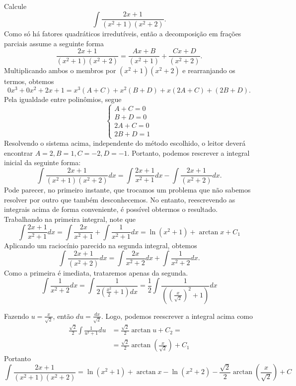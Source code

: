 	\begin{ex}
		Calcule $$\int \frac{2x + 1}{(x^2 + 1)(x^2 + 2)}.$$ Como só há fatores quadráticos irredutíveis, então a decomposição em frações parciais assume a seguinte forma $$\frac{2x + 1}{(x^2 + 1)(x^2+2)} = \frac{Ax + B}{(x^2+1)} + \frac{Cx + D}{(x^2 + 2)}.$$ Multiplicando ambos o membros por $(x^2 + 1)(x^2 + 2)$ e rearranjando os termos, obtemos $$0x^3 + 0x^2 + 2x + 1 = x^3(A +C) + x^2(B+D) + x(2A + C)+ (2B + D).$$ Pela igualdade entre polinômios, segue
		\[
		\begin{cases}
			A + C = 0 \\
			B + D = 0 \\
			2A + C = 0 \\
			2B + D =1
		\end{cases}
		\]	
		Resolvendo o sistema acima, independente do método escolhido, o leitor deverá encontrar $A=2, B=1, C=-2, D=-1$.	Portanto, podemos rescrever a integral inicial da seguinte forma: $$	\int \frac{2x+1}{(x^2+1)(x^2+2)}dx = \int \frac{2x+1}{x^2+1}dx - \int \frac{2x+1}{(x^2+2)}dx.$$ Pode parecer, no primeiro instante, que trocamos um problema que não sabemos resolver por outro que também desconhecemos. No entanto, reescrevendo as integrais acima de forma conveniente, é possível obtermos o resultado. Trabalhando na primeira integral, note que $$\int \frac{2x+1}{x^2+1}dx = \int \frac{2x}{x^2+1} + \int \frac{1}{x^2 + 1}dx =  \ln(x^2 + 1) + \arctan x + C_1$$
		Aplicando um raciocínio parecido na segunda integral, obtemos $$\int \frac{2x+1}{(x^2+2)}dx = \int \frac{2x}{x^2 + 2}dx + \int \frac{1}{x^2+2}dx.$$
		Como a primeira é imediata, trataremos apenas da segunda.  $$\int \frac{1}{x^2 +2}dx = \int \frac{1}{2(\frac{x^2}{2}+ 1)dx} = \frac{1}{2} \int \frac{1}{((\frac{x}{\sqrt 2})^2+1)}dx$$	
		
		Fazendo $u = \frac{x}{\sqrt2}$, então $du = \frac{dx}{\sqrt2}$. Logo, podemos reescrever a integral acima como
		\[\begin{split}
			\frac{\sqrt2}{2} \int \frac{1}{u^2+1}du & = \frac{\sqrt2}{2} \arctan u + C_2 = \\
			&= \frac{\sqrt2}{2} \arctan(\frac{x}{\sqrt2}) + C_1
		\end{split}\]
		Portanto  $$\int \frac{2x+1}{(x^2+1)(x^2+2)} = \ln(x^2+1) + \arctan x - \ln(x^2+2) - \frac{\sqrt2}{2} \arctan(\frac{x}{\sqrt2}) + C $$ 
	\end{ex}
	
